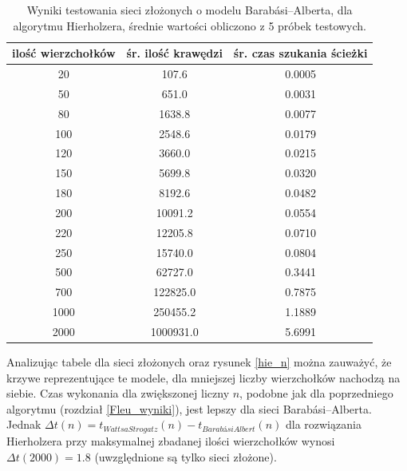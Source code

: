 \documentclass[a4paper, 12pt, twoside, openright]{article}
\begin{document}
\begin{table}[H]
	\centering
	\caption{Wyniki testowania sieci złożonych o modelu Barabási–Alberta, dla algorytmu Hierholzera, średnie wartości obliczono z 5 próbek testowych.}

	\resizebox{14.5cm}{!}
	{
	\begin{tabular}{|c c c|}
		\hline
		ilość wierzchołków	& śr. ilość krawędzi 		& śr. czas szukania ścieżki \\ \hline \hline
		20 	& 107.6 		& 0.0005 	\\ \hline
		50 	& 651.0 		& 0.0031 	\\ \hline
		80 	& 1638.8        & 0.0077	\\ \hline
		100 & 2548.6        & 0.0179	\\ \hline
		120 & 3660.0        & 0.0215	\\ \hline
		150 & 5699.8   		& 0.0320	\\ \hline
		180 & 8192.6        & 0.0482	\\ \hline
		200 & 10091.2 		& 0.0554	\\ \hline
		220 & 12205.8 		& 0.0710	\\ \hline
		250 & 15740.0 		& 0.0804	\\ \hline
		500 & 62727.0 		& 0.3441	\\ \hline				
		700 & 122825.0      & 0.7875	\\ \hline
		1000& 250455.2	    & 1.1889 	\\ \hline
		2000& 1000931.0    	& 5.6991	\\ \hline
	\end{tabular} 
	}
	\label{Tab:Hie_BA}
\end{table}

	Analizując tabele dla sieci złożonych oraz rysunek \ref{hie_n} można zauważyć, że krzywe reprezentujące te modele, dla mniejszej liczby wierzchołków nachodzą na siebie. Czas wykonania dla zwiększonej liczny $n$, podobne jak dla poprzedniego algorytmu (rozdział \ref{Fleu_wyniki}), jest lepszy dla sieci Barabási–Alberta. Jednak $\Delta t(n) = t_{WattsaStrogatz}(n) - t_{BarabásiAlbert}(n)$ dla rozwiązania Hierholzera przy maksymalnej zbadanej ilości wierzchołków wynosi $\Delta t(2000) = 1.8$ (uwzględnione są tylko sieci złożone).
\end{document}
